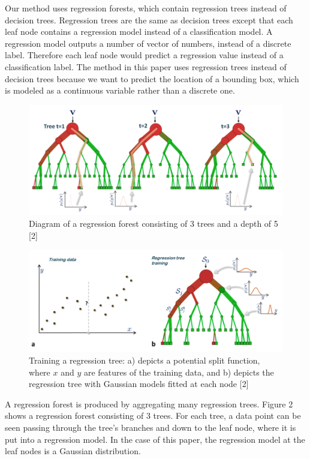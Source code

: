 Our method uses regression forests, which contain regression trees instead of decision trees. Regression trees are the same as decision trees except that each leaf node contains a regression model instead of a classification model. A regression model outputs a number of vector of numbers, instead of a discrete label. Therefore each leaf node would predict a regression value instead of a classification label. The method in this paper uses regression trees instead of decision trees because we want to predict the location of a bounding box, which is modeled as a continuous variable rather than a discrete one.

\begin{figure}
\includegraphics[scale=0.45]{regressionforest.png}
\caption{Diagram of a regression forest consisting of 3 trees and a depth of 5 [2]}
\end{figure}

\begin{figure}
\includegraphics[scale=0.45]{regressiontraining.png}
\caption{Training a regression tree: a) depicts a potential split function, where $x$ and $y$ are features of the training data, and b) depicts the regression tree with Gaussian models fitted at each node [2]}
\end{figure}

A regression forest is produced by aggregating many regression trees. Figure 2 shows a regression forest consisting of 3 trees. For each tree, a data point can be seen passing through the tree's branches and down to the leaf node, where it is put into a regression model. In the case of this paper, the regression model at the leaf nodes is a Gaussian distribution.
  
